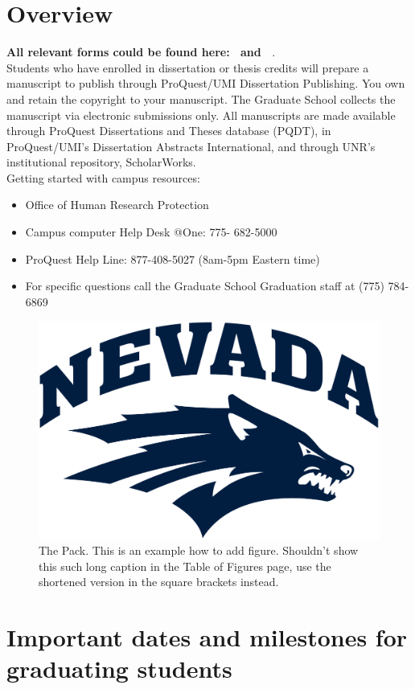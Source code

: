 \section{Overview}
{\color{red}\textbf{All relevant forms could be found here:~\cite{unr-2020} and ~\cite{unr-2020-forms}}.} \\

Students who have enrolled in dissertation or thesis credits will prepare a manuscript to publish through ProQuest/UMI Dissertation Publishing. You own and retain the copyright to your manuscript. The Graduate School collects the manuscript via electronic submissions only. All manuscripts are made available through ProQuest Dissertations and Theses database (PQDT), in ProQuest/UMI’s Dissertation Abstracts International, and through UNR’s institutional repository, ScholarWorks. \\

Getting started with campus resources:

\begin{itemize}
    \item Office of Human Research Protection
    \item Campus computer Help Desk @One: 775- 682-5000
    \item ProQuest Help Line: 877-408-5027 (8am-5pm Eastern time)
    \item For specific questions call the Graduate School Graduation staff at (775) 784-6869
\end{itemize}

\begin{figure}[h!]
    \centering
    \includegraphics[width=0.5\columnwidth]{PNG/logo.png}
    \caption[Shorter and nicer description]{The Pack. This is an example how to add figure. Shouldn't show this such long caption in the Table of Figures page, use the shortened version in the square brackets instead.}
    \label{fig:my_label}
\end{figure}

\section{Important dates and milestones for graduating students}

